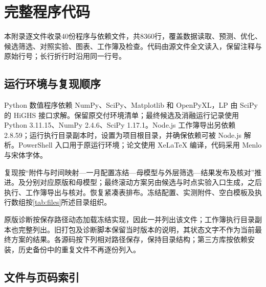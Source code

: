 \clearpage

\section{完整程序代码}

\label{app:complete_code}

本附录逐文件收录40份程序与依赖文件，共8360行，覆盖数据读取、预测、优化、候选筛选、对照实验、图表、工作簿及检查。代码由源文件全文读入，保留注释与原始行号；长行折行时沿用同一行号。

\subsection*{运行环境与复现顺序}

Python 数值程序依赖 NumPy、SciPy、Matplotlib 和 OpenPyXL，LP 由 SciPy 的 HiGHS 接口求解。保留原交付环境清单；最终候选及消融运行记录使用 Python 3.11.15、NumPy 2.4.6、SciPy 1.17.1。Node.js 工作簿导出另依赖 2.8.59；运行执行目录副本时，设置为项目根目录，并确保依赖可被 Node.js 解析。PowerShell 入口用于原运行环境；论文使用 XeLaTeX 编译，代码采用 Menlo 与宋体字体。

复现按“附件与时间映射—一月配置冻结—母模型与外层筛选—结果发布及核对”推进。及分别对应原版和母模型；最终滚动方案另由候选与时点实验入口生成，之后执行、工作簿导出与核对。恢复紧凑表排布。冻结配置、实测附件、空白模板及执行数组按\ref{tab:files}所述目录组织。

原版诊断按保存路径动态加载冻结实现，因此一并列出该文件；工作簿执行目录副本也完整列出。旧打包及诊断脚本保留当时版本的说明，其状态文字不作为当前最终方案的结果。各源码按下列相对路径保存，保持目录结构；第三方库按依赖安装，历史备份中的重复文件不再逐份列入。

\subsection*{文件与页码索引}

\begingroup\small\setlength{\tabcolsep}{4pt}

